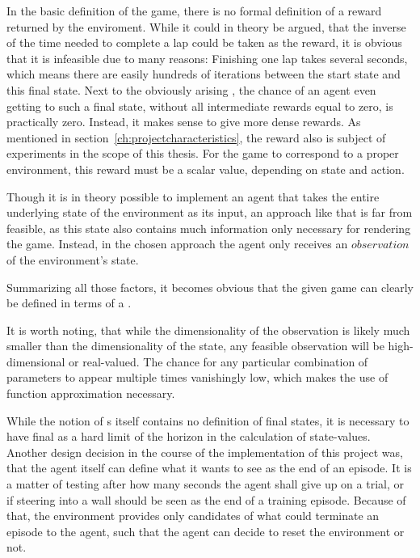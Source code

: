 In the basic definition of the game, there is no formal definition of a reward returned by the enviroment. While it could in theory be argued, that the inverse of the time needed to complete a lap could be taken as the reward, it is obvious that it is infeasible due to many reasons: Finishing one lap takes several seconds, which means there are easily hundreds of iterations between the start state and this final state. Next to the obviously arising , the chance of an agent even getting to such a final state, without all intermediate rewards equal to zero, is practically zero. Instead, it makes sense to give more dense rewards. As mentioned in section~\ref{ch:projectcharacteristics}, the reward also is subject of experiments in the scope of this thesis. For the game to correspond to a proper environment, this reward must be a scalar value, depending on state and action.

Though it is in theory possible to implement an agent that takes the entire underlying state of the environment as its input, an approach like that is far from feasible, as this state also contains much information only necessary for rendering the game. Instead, in the chosen approach the agent only receives an $observation$ of the environment's state. 

Summarizing all those factors, it becomes obvious that the given game can clearly be defined in terms of a .

It is worth noting, that while the dimensionality of the observation is likely much smaller than the dimensionality of the state, any feasible observation will be high-dimensional or real-valued. The chance for any particular combination of parameters to appear multiple times vanishingly low, which makes the use of function approximation necessary.

While the notion of s itself contains no definition of final states, it is necessary to have final as a hard limit of the horizon in the calculation of state-values. Another design decision in the course of the implementation of this project was, that the agent itself can define what it wants to see as the end of an episode. It is a matter of testing after how many seconds the agent shall give up on a trial, or if steering into a wall should be seen as the end of a training episode. Because of that, the environment provides only candidates of what could terminate an episode to the agent, such that the agent can decide to reset the environment or not. \\

